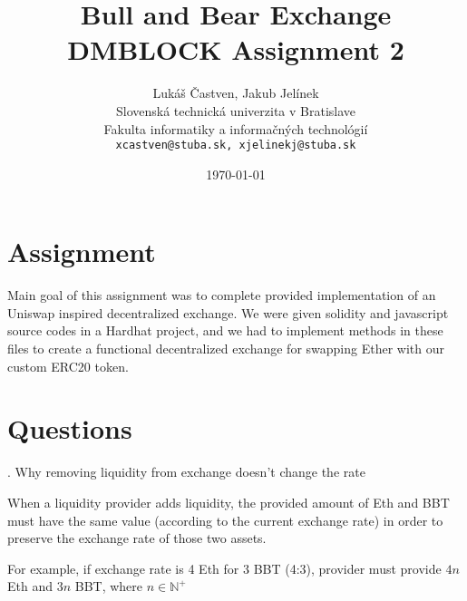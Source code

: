 \documentclass[11pt,a4paper]{article}
\title{Bull and Bear Exchange\\
    \large DMBLOCK Assignment 2}
\author{Lukáš Častven, Jakub Jelínek\\[2pt]
	{\small Slovenská technická univerzita v Bratislave}\\
	{\small Fakulta informatiky a informačných technológií}\\
	{\small \texttt{xcastven@stuba.sk, xjelinekj@stuba.sk}}
}
\date{\today}
\newcounter{question}
\newcommand\Que[1]{
   \leavevmode\par
   \stepcounter{question}
   \noindent
   \thequestion. #1\par}
\newcommand\Ans[2][]{
    \leavevmode\par\noindent
   {\leftskip37pt
    \textbf{#1}#2\par}}
\begin{document}
\pagestyle{plain}

\maketitle
\tableofcontents
\pagebreak

\section{Assignment}

Main goal of this assignment was to complete provided implementation of an
Uniswap\cite{uniswapDocs} inspired decentralized exchange. We were given
solidity and javascript source codes in a Hardhat project, and we had to
implement methods in these files to create a functional decentralized exchange
for swapping Ether with our custom ERC20 token.

\section{Questions}

\Que{Why removing liquidity from exchange doesn't change the rate}
\Ans{
When a liquidity provider adds liquidity, the provided amount of Eth and
BBT must have the same value (according to the current exchange rate) in order
to preserve the exchange rate of those two assets.

For example, if exchange rate is 4 Eth for 3 BBT (4:3), provider must provide
$4n$ Eth and $3n$ BBT, where $n \in \mathbb{N}^+$
}
\end{document}
